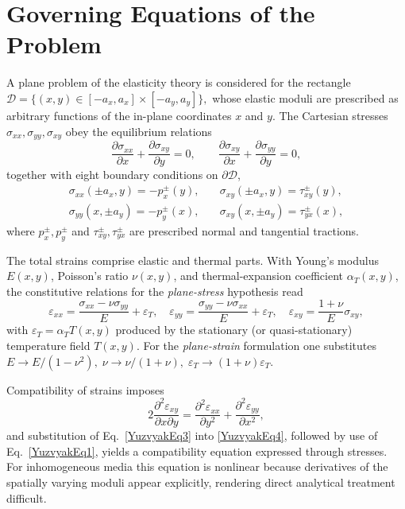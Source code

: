 \section{Governing Equations of the Problem}

\noindent
A plane problem of the elasticity theory is considered for the rectangle  
\(
\mathcal{D}=\{(x,y)\in[-a_x,a_x]\times[-a_y,a_y]\},
\)
whose elastic moduli are prescribed as arbitrary functions of the in-plane coordinates \(x\) and \(y\).
The Cartesian stresses \(\sigma_{xx},\sigma_{yy},\sigma_{xy}\) obey the equilibrium relations
\begin{equation}
	\frac{\partial\sigma_{xx}}{\partial x}+\frac{\partial\sigma_{xy}}{\partial y}=0, 
	\qquad
	\frac{\partial\sigma_{xy}}{\partial x}+\frac{\partial\sigma_{yy}}{\partial y}=0,
	\label{YuzvyakEq1}
\end{equation}
together with eight boundary conditions on \(\partial\mathcal{D}\),
\begin{equation}
	\begin{array}{cc}
		\sigma_{xx}(\pm a_x,y)=-p_x^{\pm}(y), & \quad
		\sigma_{xy}(\pm a_x,y)=\tau_{xy}^{\pm}(y),\\[2pt]
		\sigma_{yy}(x,\pm a_y)=-p_y^{\pm}(x), & \quad
		\sigma_{xy}(x,\pm a_y)=\tau_{yx}^{\pm}(x),
	\end{array}
	\label{YuzvyakEq2}
\end{equation}
where \(p_x^{\pm},p_y^{\pm}\) and \(\tau_{xy}^{\pm},\tau_{yx}^{\pm}\) are prescribed normal and tangential tractions.

The total strains comprise elastic and thermal parts.  
With Young’s modulus \(E(x,y)\), Poisson’s ratio \(\nu(x,y)\), and thermal-expansion coefficient \(\alpha_T(x,y)\), the constitutive relations for the \emph{plane-stress} hypothesis read
\begin{equation}
	\varepsilon_{xx}= \frac{\sigma_{xx}-\nu\sigma_{yy}}{E}+\varepsilon_T,\quad
	\varepsilon_{yy}= \frac{\sigma_{yy}-\nu\sigma_{xx}}{E}+\varepsilon_T,\quad
	\varepsilon_{xy}= \frac{1+\nu}{E} \sigma_{xy},
	\label{YuzvyakEq3}
\end{equation}
with \(\varepsilon_T=\alpha_T T(x,y)\) produced by the stationary (or quasi-stationary) temperature field \(T(x,y)\).
For the \emph{plane-strain} formulation one substitutes
\(
E \to  E/(1-\nu^{2}),\;
\nu \to \nu/(1+\nu),\;
\varepsilon_T \to (1+\nu) \varepsilon_T.
\)

Compatibility of strains imposes
\begin{equation}
	2 \frac{\partial^{2}\varepsilon_{xy}}{\partial x \partial y}=
	\frac{\partial^{2}\varepsilon_{xx}}{\partial y^{2}}+
	\frac{\partial^{2}\varepsilon_{yy}}{\partial x^{2}},
	\label{YuzvyakEq4}
\end{equation}
and substitution of Eq.~\eqref{YuzvyakEq3} into \eqref{YuzvyakEq4}, followed by use of Eq.~\eqref{YuzvyakEq1}, yields a compatibility equation expressed through stresses.  
For inhomogeneous media this equation is nonlinear because derivatives of the spatially varying moduli appear explicitly, rendering direct analytical treatment difficult.

